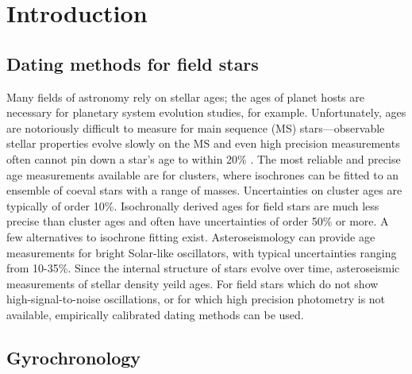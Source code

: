 \documentclass[10pt,preprint]{aastex}
\begin{document}
\section{Introduction}
\label{intro}

\subsection{Dating methods for field stars}

Many fields of astronomy rely on stellar ages; the ages of planet hosts are necessary for planetary system evolution studies, for example.
Unfortunately, ages are notoriously difficult to measure for main sequence (MS) stars---observable stellar properties evolve slowly on the MS and even high precision measurements often cannot pin down a star's age to within 20\% \citep{Soderblom2010}.
The most reliable and precise age measurements available are for clusters, where isochrones can be fitted to an ensemble of coeval stars with a range of masses.
Uncertainties on cluster ages are typically of order 10\%.
Isochronally derived ages for field stars are much less precise than cluster ages and often have uncertainties of order 50\% or more.
A few alternatives to isochrone fitting exist.
Asteroseismology can provide age measurements for bright Solar-like oscillators, with typical uncertainties ranging from 10-35\%.
Since the internal structure of stars evolve over time, asteroseismic measurements of stellar density yeild ages.
For field stars which do not show high-signal-to-noise oscillations, or for which high precision photometry is not available, empirically calibrated dating methods can be used.


\subsection{Gyrochronology}
\end{document}

